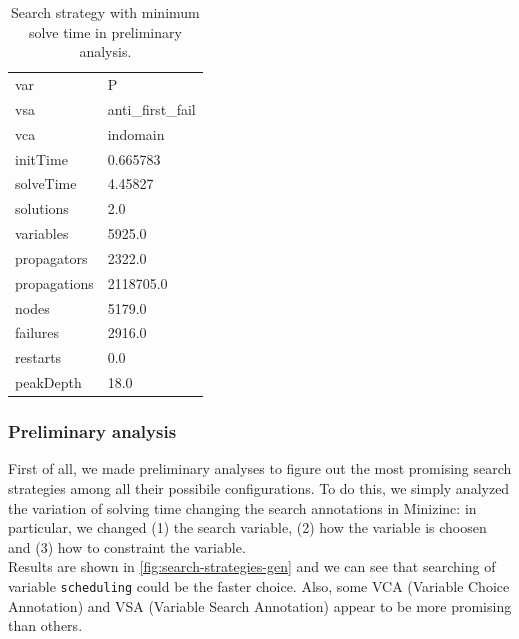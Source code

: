 \documentclass[10pt]{article}
\begin{document}
	\begin{table}[h]
		\centering
		\scriptsize
		\begin{tabular}{ll}
			\toprule
			var          &                P \\
			vsa          &  anti\_first\_fail\\
			vca          &         indomain \\
			\midrule
			initTime     &         0.665783 \\
			solveTime    &          4.45827 \\
			solutions    &              2.0 \\
			variables    &           5925.0 \\
			propagators  &           2322.0 \\
			propagations &        2118705.0 \\
			nodes        &           5179.0 \\
			failures     &           2916.0 \\
			restarts     &              0.0 \\
			peakDepth    &             18.0 \\
			\bottomrule
		\end{tabular}
		\caption{Search strategy with minimum solve time in preliminary analysis.}
		\label{tab:best-strategy}
	\end{table}

	

	\subsubsection{Preliminary analysis}
	\label{subsubsec:preliminary-analysis}
	
	First of all, we made preliminary analyses to figure out the most promising
	search strategies among all their possibile configurations. To do this,
	we simply analyzed the variation of solving time changing the search 
	annotations in Minizinc: in particular, we changed (1) the search 
	variable, (2) how the variable is choosen and (3) how to constraint
	the variable. \\Results are shown in \cref{fig:search-strategies-gen} 
	and we can see that searching of variable \texttt{scheduling} could be 
	the faster choice. Also, some VCA (Variable Choice Annotation) and VSA 
	(Variable Search Annotation) appear to be more promising than others. 
\end{document}
